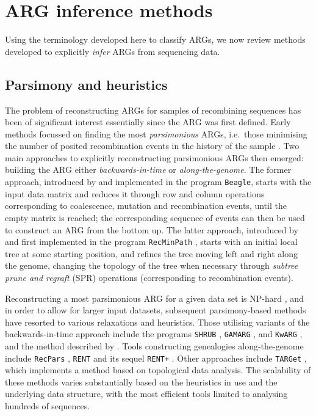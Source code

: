 \documentclass{article}
\begin{document}
\section*{ARG inference methods}\label{ARG_inference_methods}
Using the terminology developed here to classify ARGs, we now review methods developed
to explicitly \emph{infer} ARGs from sequencing data.

\subsection*{Parsimony and heuristics}
The problem of reconstructing ARGs for samples of recombining sequences has been of significant
 interest essentially since the ARG was first defined. Early methods focussed on finding the most
 \emph{parsimonious} ARGs, i.e.\ those minimising the number of posited recombination events in
 the history of the sample \citep{hein1990reconstructing}. Two main approaches to explicitly reconstructing
 parsimonious ARGs then emerged: building the ARG either \emph{backwards-in-time} or \emph{along-the-genome}.
 The former approach, introduced by \citet{lyngso2005minimum} and implemented in the program
 \texttt{Beagle}, starts with the input data matrix and reduces it through row and column operations
 corresponding to coalescence, mutation and recombination events, until the empty matrix is reached;
 the corresponding sequence of events can then be used to construct an ARG from the bottom up. The
 latter approach, introduced by \citet{song2003parsimonious} and first implemented in the program
 \texttt{RecMinPath} \citep{song2005constructing}, starts with an initial local tree at some starting
 position, and refines the tree moving left and right along the genome, changing the topology of the
 tree when necessary through \emph{subtree prune and regraft} (SPR) operations (corresponding to
 recombination events).

Reconstructing a most parsimonious ARG for a given data set is NP-hard \citep{wang2001perfect},
and in order to allow for larger input datasets, subsequent parsimony-based methods have resorted
to various relaxations and heuristics. Those utilising variants of the backwards-in-time approach
include the programs \texttt{SHRUB} \citep{song2005efficient}, \texttt{GAMARG} \citep{thao2019hybrid},
and \texttt{KwARG} \citep{ignatieva2021kwarg}, and the method described by \citet{wu2008association}.
Tools constructing genealogies along-the-genome include \texttt{RecPars} \citep{hein1993heuristic},
\texttt{RENT} \citep{wu2011new} and its sequel \texttt{RENT+} \citep{mirzaei2017rent}. Other approaches
include \texttt{TARGet} \citep{camara2016inference}, which implements a method based on topological
data analysis. The scalability of these methods varies substantially based on the heuristics in use
and the underlying data structure, with the most efficient tools limited to analysing hundreds of
sequences.
\end{document}
